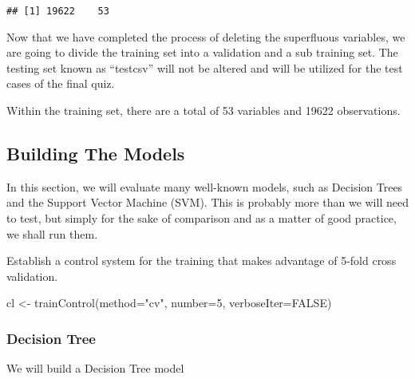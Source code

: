 \documentclass[
]{article}
\newenvironment{Shaded}{\begin{snugshade}}{\end{snugshade}}
\newcommand{\AttributeTok}[1]{\textcolor[rgb]{0.77,0.63,0.00}{#1}}
\newcommand{\ConstantTok}[1]{\textcolor[rgb]{0.00,0.00,0.00}{#1}}
\newcommand{\DecValTok}[1]{\textcolor[rgb]{0.00,0.00,0.81}{#1}}
\newcommand{\FunctionTok}[1]{\textcolor[rgb]{0.00,0.00,0.00}{#1}}
\newcommand{\NormalTok}[1]{#1}
\newcommand{\OtherTok}[1]{\textcolor[rgb]{0.56,0.35,0.01}{#1}}
\newcommand{\SpecialCharTok}[1]{\textcolor[rgb]{0.00,0.00,0.00}{#1}}
\newcommand{\StringTok}[1]{\textcolor[rgb]{0.31,0.60,0.02}{#1}}
\begin{document}
\begin{verbatim}
## [1] 19622    53
\end{verbatim}

Now that we have completed the process of deleting the superfluous
variables, we are going to divide the training set into a validation and
a sub training set. The testing set known as ``testcsv'' will not be
altered and will be utilized for the test cases of the final quiz.

Within the training set, there are a total of 53 variables and 19622
observations.

\hypertarget{building-the-models}{%
\subsection{Building The Models}\label{building-the-models}}

In this section, we will evaluate many well-known models, such as
Decision Trees and the Support Vector Machine (SVM). This is probably
more than we will need to test, but simply for the sake of comparison
and as a matter of good practice, we shall run them.

Establish a control system for the training that makes advantage of
5-fold cross validation.

\begin{Shaded}
\begin{Highlighting}[]
\NormalTok{cl }\OtherTok{\textless{}{-}} \FunctionTok{trainControl}\NormalTok{(}\AttributeTok{method=}\StringTok{"cv"}\NormalTok{, }\AttributeTok{number=}\DecValTok{5}\NormalTok{, }\AttributeTok{verboseIter=}\ConstantTok{FALSE}\NormalTok{)}
\end{Highlighting}
\end{Shaded}

\hypertarget{decision-tree}{%
\subsubsection{Decision Tree}\label{decision-tree}}

We will build a Decision Tree model

\begin{Shaded}
\end{Shaded}
\end{document}
